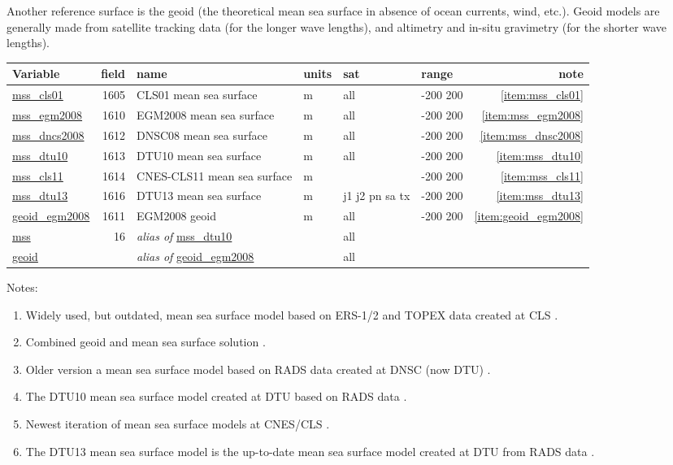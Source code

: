 \documentclass[a4paper,11pt,openany,natbib]{thesis}
\makeatletter
\newcommand\var[1]{\url{#1}\index{variables!#1@\protect\url{#1}}}
\newcommand\alias[1]{\emph{alias of} \var{#1}}
\newenvironment{vartable}{
\begin{table}[ht]
\small
\begin{tabular}{lrllllr}
\hline
Variable & field & name & units & sat & range & note \\
\hline
}{
\hline
\end{tabular}
\end{table}
}
\makeatother
\begin{document}
Another reference surface is the geoid (the theoretical mean sea surface in absence of ocean currents, wind, etc.). Geoid models are generally made from satellite tracking data (for the longer wave lengths), and altimetry and in-situ gravimetry (for the shorter wave lengths).

\begin{vartable}
\var{mss_cls01} & 1605 & CLS01 mean sea surface & m & all & -200 200 & \ref{item:mss_cls01} \\
\var{mss_egm2008} & 1610 & EGM2008 mean sea surface & m & all & -200 200 & \ref{item:mss_egm2008} \\
\var{mss_dncs2008} & 1612 & DNSC08 mean sea surface & m & all & -200 200 & \ref{item:mss_dnsc2008} \\
\var{mss_dtu10} & 1613 & DTU10 mean sea surface & m & all & -200 200 & \ref{item:mss_dtu10} \\
\var{mss_cls11} & 1614 & {CNES-CLS11} mean sea surface & m &  & -200 200 & \ref{item:mss_cls11} \\
\var{mss_dtu13} & 1616 & DTU13 mean sea surface & m & j1 j2 pn sa tx & -200 200 & \ref{item:mss_dtu13} \\
\var{geoid_egm2008} & 1611 & EGM2008 geoid & m & all & -200 200 & \ref{item:geoid_egm2008} \\ 
\hline
\var{mss} & 16 & \alias{mss_dtu10} && all && \\
\var{geoid} && \alias{geoid_egm2008} && all && \\
\end{vartable}

Notes:
\begin{enumerate}
\item Widely used, but outdated, mean sea surface model based on ERS-1/2 and TOPEX data created at CLS \citep{hernandez2001}.\label{item:mss_cls01}
\item Combined geoid and mean sea surface solution \citep{pavlis2008}.\label{item:mss_egm2008}\label{item:geoid_egm2008}
\item Older version a mean sea surface model based on RADS data created at DNSC (now DTU) \citep{andersen2009}.\label{item:mss_dnsc2008}
\item The DTU10 mean sea surface model created at DTU based on RADS data \citep{andersen2010}.\label{item:mss_dtu10}
\item Newest iteration of mean sea surface models at CNES/CLS \citep{schaeffer2012}.\label{item:mss_cls11}
\item The DTU13 mean sea surface model is the up-to-date mean sea surface model created at DTU from RADS data \citep{andersen2013a}.\label{item:mss_dtu13}
\end{enumerate}
\end{document}
